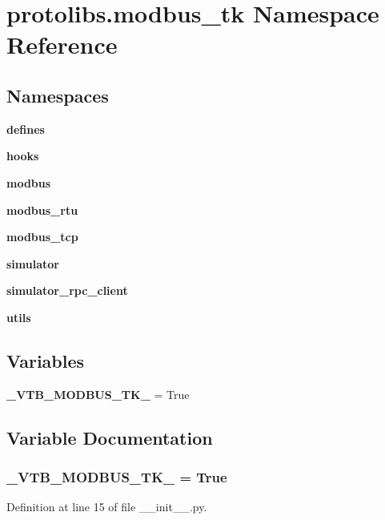 \section{protolibs.\+modbus\+\_\+tk Namespace Reference}
\label{namespaceprotolibs_1_1modbus__tk}
\subsection*{Namespaces}
\begin{DoxyCompactItemize}
\item 
 {\bf defines}
\item 
 {\bf hooks}
\item 
 {\bf modbus}
\item 
 {\bf modbus\+\_\+rtu}
\item 
 {\bf modbus\+\_\+tcp}
\item 
 {\bf simulator}
\item 
 {\bf simulator\+\_\+rpc\+\_\+client}
\item 
 {\bf utils}
\end{DoxyCompactItemize}
\subsection*{Variables}
\begin{DoxyCompactItemize}
\item 
{\bf \+\_\+\+V\+T\+B\+\_\+\+M\+O\+D\+B\+U\+S\+\_\+\+T\+K\+\_\+} = True
\end{DoxyCompactItemize}


\subsection{Variable Documentation}
\subsubsection[{\+\_\+\+V\+T\+B\+\_\+\+M\+O\+D\+B\+U\+S\+\_\+\+T\+K\+\_\+}]{\setlength{\rightskip}{0pt plus 5cm}\+\_\+\+V\+T\+B\+\_\+\+M\+O\+D\+B\+U\+S\+\_\+\+T\+K\+\_\+ = True}\label{namespaceprotolibs_1_1modbus__tk_a3de03be5820c06cc016b56782811db90}


Definition at line 15 of file \+\_\+\+\_\+init\+\_\+\+\_\+.\+py.

